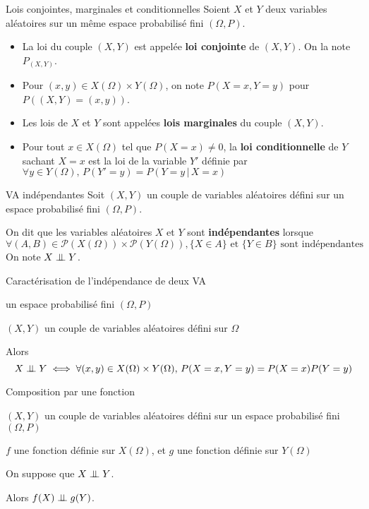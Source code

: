     \begin{defi}{Lois conjointes, marginales et conditionnelles}{}
        Soient $X$ et $Y$ deux variables aléatoires sur un même espace probabilisé fini $(\Omega,P)$.
        \begin{itemize}
            \item La loi du couple $(X,Y)$ est appelée \textbf{loi conjointe} de $(X,Y)$. On la note $P_{(X,Y)}$.
            \item Pour $(x,y) \in X(\Omega) \times Y(\Omega)$, on note $P(X=x,Y=y)$ pour $P((X,Y) = (x,y))$.
            \item Les lois de $X$ et $Y$ sont appelées \textbf{lois marginales} du couple $(X,Y)$.
            \item Pour tout $x \in X(\Omega)$ tel que $P(X=x) \neq 0$, la \textbf{loi conditionnelle} de $Y$ sachant $X=x$ est la loi de la variable $Y'$ définie par $\forall y \in Y(\Omega), \, P(Y' = y) = P(Y=y \, | \, X=x)$
        \end{itemize}
    \end{defi}

    \begin{defi}{VA indépendantes}{}
        Soit $(X,Y)$ un couple de variables aléatoires défini sur un espace probabilisé fini $(\Omega,P)$.

        On dit que les variables aléatoires $X$ et $Y$ sont \textbf{indépendantes} lorsque 
        \[ \forall (A,B) \in \mathcal{P}(X(\Omega)) \times \mathcal{P}(Y(\Omega)), \{ X \in A \} \text{ et } \{Y \in B \} \text{ sont indépendantes} \]
        On note $X \perp\mkern-9.5mu\perp Y$.
    \end{defi}

    \begin{theo}{Caractérisation de l’indépendance de deux VA}{}
        \begin{soient}
            \item un espace probabilisé fini $(\Omega,P)$
            \item $(X,Y)$ un couple de variables aléatoires défini sur $\Omega$
        \end{soient}
        Alors 
        \[ X \perp\mkern-9.5mu\perp Y \iff \forall (x,y) \in X(\Omega) \times Y(\Omega), \, P(X=x,Y=y) = P(X=x)P(Y=y) \]
    \end{theo}

    \begin{prop}{Composition par une fonction}{}
        \begin{soient}
            \item $(X,Y)$ un couple de variables aléatoires défini sur un espace probabilisé fini $(\Omega,P)$
            \item $f$ une fonction définie sur $X(\Omega)$, et $g$ une fonction définie sur $Y(\Omega)$
        \end{soient}
        On suppose que $X \perp\mkern-9.5mu\perp Y$.

        Alors $f(X) \perp\mkern-9.5mu\perp g(Y)$.
    \end{prop}

